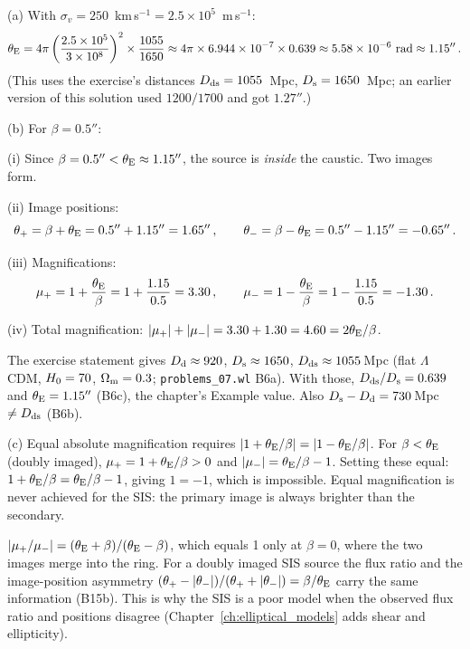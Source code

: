 (a) With $\sigma_v = 250$~km\,s$^{-1} = 2.5 \times 10^5$~m\,s$^{-1}$:
\begin{equation*}
    \theta_{\mathrm{E}} = 4\pi\left(\frac{2.5 \times 10^5}{3 \times 10^8}\right)^2
    \times \frac{1055}{1650}
    \approx 4\pi \times 6.944 \times 10^{-7} \times 0.639
    \approx 5.58 \times 10^{-6}~\text{rad}
    \approx 1.15'' \,.
\end{equation*}
(This uses the exercise's distances $D_{\mathrm{ds}} = 1055$~Mpc, $D_{\mathrm{s}} = 1650$~Mpc; an
earlier version of this solution used $1200/1700$ and got $1.27''$.)

(b) For $\beta = 0.5''$:

(i) Since $\beta = 0.5'' < \theta_{\mathrm{E}} \approx 1.15''$, the source is
\textit{inside} the caustic. Two images form.

(ii) Image positions:
\begin{equation*}
    \theta_+ = \beta + \theta_{\mathrm{E}} = 0.5'' + 1.15'' = 1.65'' \,, \qquad
    \theta_- = \beta - \theta_{\mathrm{E}} = 0.5'' - 1.15'' = -0.65'' \,.
\end{equation*}

(iii) Magnifications:
\begin{equation*}
    \mu_+ = 1 + \frac{\theta_{\mathrm{E}}}{\beta}
    = 1 + \frac{1.15}{0.5} = 3.30 \,, \qquad
    \mu_- = 1 - \frac{\theta_{\mathrm{E}}}{\beta}
    = 1 - \frac{1.15}{0.5} = -1.30 \,.
\end{equation*}

(iv) Total magnification:
$|\mu_+| + |\mu_-| = 3.30 + 1.30 = 4.60 = 2\theta_{\mathrm{E}}/\beta$.

\begin{annotation}
The exercise statement gives $D_{\mathrm{d}}\approx920$, $D_{\mathrm{s}}\approx1650$,
$D_{\mathrm{ds}}\approx1055$\,Mpc (flat $\Lambda$CDM, $H_0 = 70$, $\Omega_{\mathrm{m}} = 0.3$;
\texttt{problems\_07.wl} B6a).  With those, $D_{\mathrm{ds}}/D_{\mathrm{s}} = 0.639$ and
$\theta_{\mathrm{E}} = 1.15''$ (B6c), the chapter's Example value.  Also $D_{\mathrm{s}}-D_{\mathrm{d}} = 730$\,Mpc $\neq D_{\mathrm{ds}}$ (B6b).
\end{annotation}

(c) Equal absolute magnification requires
$|1 + \theta_{\mathrm{E}}/\beta| = |1 - \theta_{\mathrm{E}}/\beta|$.  For $\beta < \theta_{\mathrm{E}}$
(doubly imaged), $\mu_+ = 1 + \theta_{\mathrm{E}}/\beta > 0$ and
$|\mu_-| = \theta_{\mathrm{E}}/\beta - 1$.  Setting these equal:
$1 + \theta_{\mathrm{E}}/\beta = \theta_{\mathrm{E}}/\beta - 1$, giving $1 = -1$, which is
impossible.  Equal magnification is never achieved for the SIS: the primary image
is always brighter than the secondary. \checkmark

\begin{annotation}
$|\mu_+/\mu_-| = (\theta_{\mathrm{E}}+\beta)/(\theta_{\mathrm{E}}-\beta)$, which equals 1 only at $\beta = 0$,
where the two images merge into the ring.  For a doubly imaged SIS source the
flux ratio and the image-position asymmetry
$(\theta_+-|\theta_-|)/(\theta_++|\theta_-|) = \beta/\theta_{\mathrm{E}}$ carry the same
information (B15b).  This is why the SIS is a poor model when the observed flux ratio
and positions disagree (Chapter~\ref{ch:elliptical_models} adds shear and
ellipticity).
\end{annotation}

